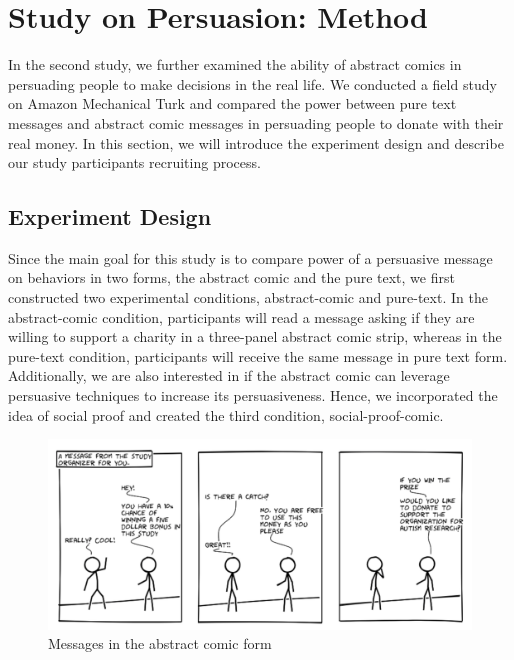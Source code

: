 \section{Study on Persuasion: Method}
\label{sec:Method2}

In the second study, we further examined the ability of abstract comics in persuading people to make decisions in the real life. We conducted a field study on Amazon Mechanical Turk and compared the power between pure text messages and abstract comic messages in persuading people to donate with their real money. In this section, we will introduce the experiment design and describe our study participants recruiting process.

\subsection{Experiment Design}
Since the main goal for this study is to compare power of a persuasive message on behaviors in two forms, the abstract comic and the pure text, we first constructed two experimental conditions, abstract-comic and pure-text. In the abstract-comic condition, participants will read a message asking if they are willing to support a charity in a three-panel abstract comic strip, whereas in the pure-text condition, participants will receive the same message in pure text form. Additionally, we are also interested in if the abstract comic can leverage persuasive techniques to increase its persuasiveness. Hence, we incorporated the idea of social proof and created the third condition, social-proof-comic.

\begin{figure}[bt]
	\centering
	\includegraphics[width=\columnwidth]{./figures/abstract_comic.png}
	\caption{Messages in the abstract comic form}
	\label{fig:basic three comic panel}
\end{figure}

